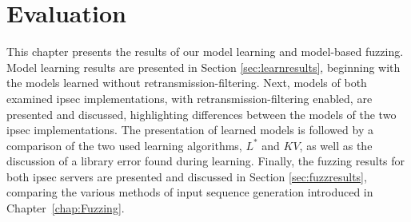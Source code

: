 %
%
% 
% 
% 

\chapter{Evaluation} \label{chap:Evaluation}

This chapter presents the results of our model learning and model-based fuzzing. Model learning results are presented in Section \ref{sec:learnresults}, beginning with the models learned without retransmission-filtering. Next, models of both examined \ac{ipsec} implementations, with retransmission-filtering enabled, are presented and discussed, highlighting differences between the models of the two \ac{ipsec} implementations. The presentation of learned models is followed by a comparison of the two used learning algorithms, $L^*$ and $KV$, as well as the discussion of a library error found during learning. Finally, the fuzzing results for both \ac{ipsec} servers are presented and discussed in Section \ref{sec:fuzzresults}, comparing the various methods of input sequence generation introduced in Chapter~\ref{chap:Fuzzing}.

\iffalse
